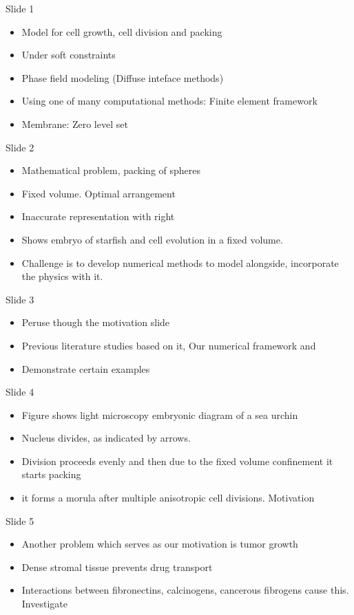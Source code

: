 \documentclass[a4paper,oneside,11pt]{report}
\begin{document}
	Slide 1
	\begin{itemize}
		\item Model for cell growth, cell division and packing 
		\item Under soft constraints
		\item Phase field modeling (Diffuse inteface methods)
		\item Using one of many computational methods: Finite element framework
		\item Membrane: Zero level set
	\end{itemize}
   Slide 2
   \begin{itemize}
   	\item Mathematical problem, packing of spheres
   	\item Fixed volume. Optimal arrangement
   	\item Inaccurate representation with right
   	\item Shows embryo of starfish and cell evolution in a fixed volume.
   	\item Challenge is to develop numerical methods to model alongside, incorporate the physics with it.
   \end{itemize}
   Slide 3
   \begin{itemize}
   	\item Peruse though the motivation slide 
   	\item Previous literature studies based on it, Our numerical framework and
   	\item Demonstrate certain examples
   \end{itemize}
   Slide 4
   \begin{itemize}
   	\item Figure shows light microscopy embryonic diagram of a sea urchin
   	\item Nucleus divides, as indicated by arrows.
   	\item Division proceeds evenly and then due to the fixed volume confinement it starts packing
   	\item it forms a morula after multiple anisotropic cell divisions. Motivation
   \end{itemize}
   Slide 5
   \begin{itemize}
   	\item Another problem which serves as our motivation is tumor growth
   	\item Dense stromal tissue prevents drug transport
   	\item Interactions between fibronectins, calcinogens, cancerous fibrogens cause this. Investigate
   \end{itemize}
\end{document}
